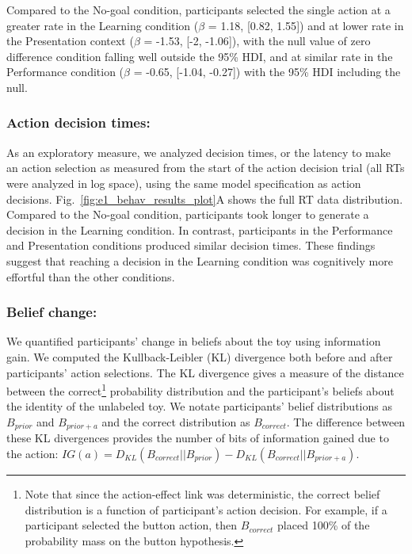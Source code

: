 \documentclass[10pt, letterpaper]{article}
\begin{document}
Compared to the No-goal condition, participants selected the single
action at a greater rate in the Learning condition (\(\beta\) = 1.18,
{[}0.82, 1.55{]}) and at lower rate in the Presentation context
(\(\beta\) = -1.53, {[}-2, -1.06{]}), with the null value of zero
difference condition falling well outside the 95\% HDI, and at similar
rate in the Performance condition (\(\beta\) = -0.65, {[}-1.04,
-0.27{]}) with the 95\% HDI including the null.

\subsubsection{Action decision times:}\label{action-decision-times}

As an exploratory measure, we analyzed decision times, or the latency to
make an action selection as measured from the start of the action
decision trial (all RTs were analyzed in log space), using the same
model specification as action decisions.
Fig.~\ref{fig:e1_behav_results_plot}A shows the full RT data
distribution. Compared to the No-goal condition, participants took
longer to generate a decision in the Learning condition. In contrast,
participants in the Performance and Presentation conditions produced
similar decision times. These findings suggest that reaching a decision
in the Learning condition was cognitively more effortful than the other
conditions.

\subsubsection{Belief change:}\label{belief-change}

We quantified participants' change in beliefs about the toy using
information gain. We computed the Kullback-Leibler (KL) divergence both
before and after participants' action selections. The KL divergence
gives a measure of the distance between the correct\footnote{Note that
  since the action-effect link was deterministic, the correct belief
  distribution is a function of participant's action decision. For
  example, if a participant selected the button action, then
  \(B_{correct}\) placed 100\% of the probability mass on the button
  hypothesis.} probability distribution and the participant's beliefs
about the identity of the unlabeled toy. We notate participants' belief
distributions as \(B_{prior}\) and \(B_{prior+a}\) and the correct
distribution as \(B_{correct}\). The difference between these KL
divergences provides the number of bits of information gained due to the
action:
\(IG(a) = D_{KL} ( B_{correct}|| B_{prior} ) - D_{KL} (B_{correct} || B_{prior+a} )\).
\end{document}
